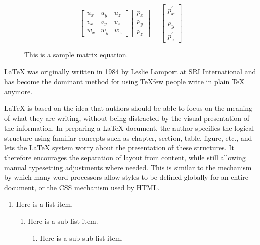 \documentclass[12pt]{ucthesis}
\newcommand{\captionfonts}{\small\bf\ssp}
\begin{document}
\begin{figure}
\begin{center}
\[
\left[\begin{array}{ccc}
u_{x} & u_{y} & u_{z}\\
v_{x} & v_{y} & v_{z}\\
w_{x} & w_{y} & w_{z}\end{array}\right]\left[\begin{array}{c}
p_{x}\\
p_{y}\\
p_{z}\end{array}\right]=\left[\begin{array}{c}
p_{x}^{\prime}\\
p_{y}^{\prime}\\
p_{z}^{\prime}\end{array}\right]\]
\captionfonts
\caption[A matrix equation]{This is a sample matrix equation.}
\label{eqn:example}
\end{center}
\end{figure}


LaTeX was originally written in 1984 by Leslie Lamport at SRI International and has become the dominant method for using TeXfew people write in plain TeX anymore.

LaTeX is based on the idea that authors should be able to focus on the meaning of what they are writing, without being distracted by the visual presentation of the information. In preparing a LaTeX document, the author specifies the logical structure using familiar concepts such as chapter, section, table, figure, etc., and lets the LaTeX system worry about the presentation of these structures. It therefore encourages the separation of layout from content, while still allowing manual typesetting adjustments where needed. This is similar to the mechanism by which many word processors allow styles to be defined globally for an entire document, or the CSS mechanism used by HTML.


\begin{enumerate}
\item Here is a list item.
\begin{enumerate}
\item Here is a sub list item.
\begin{enumerate}
\item Here is a sub sub list item.

\end{enumerate}
\end{enumerate}
\end{enumerate}
\end{document}
